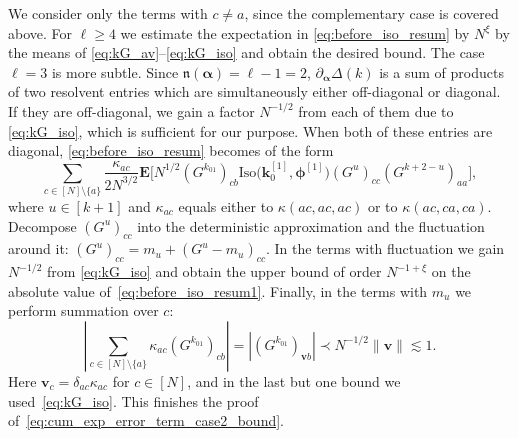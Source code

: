 \documentclass[10pt]{amsart}
\numberwithin{equation}{section}
\newcommand{\E}{\mathbf{E}}
\begin{document}
We consider only the terms with $c\neq a$, since the complementary case is covered above. For $\ell\ge 4$ we estimate the expectation in \eqref{eq:before_iso_resum} by $N^\xi$ by the means of \eqref{eq:kG_av}--\eqref{eq:kG_iso} and obtain the desired bound. The case $\ell=3$ is more subtle. Since $\mathfrak{n}(\bm{\alpha})=\ell-1=2$, $\partial_{\bm{\alpha}}\Delta(k)$ is a sum of products of two resolvent entries which are simultaneously either off-diagonal or diagonal. If they are off-diagonal, we gain a factor $N^{-1/2}$ from each of them due to \eqref{eq:kG_iso}, which is sufficient for our purpose. When both of these entries are diagonal, \eqref{eq:before_iso_resum} becomes of the form
\begin{equation}
\sum_{c\in [N]\setminus\{a\}}\frac{\kappa_{ac}}{2N^{3/2}}\E\bigg[N^{1/2}\left(G^{k_{01}}\right)_{cb}\mathrm{Iso}\big(\bm{k}_0^{[1]},\bm{\phi}^{[1]}\big) (G^u)_{cc}(G^{k+2-u})_{aa}\bigg],
\label{eq:before_iso_resum1}
\end{equation}
where $u\in [k+1]$ and $\kappa_{ac}$ equals either to $\kappa(ac,ac,ac)$ or to $\kappa(ac,ca,ca)$. Decompose $(G^u)_{cc}$ into the deterministic approximation and the fluctuation around it: $(G^u)_{cc}= m_u + (G^u-m_u)_{cc}$. In the terms with fluctuation we gain $N^{-1/2}$ from \eqref{eq:kG_iso} and obtain the upper bound of order $N^{-1+\xi}$ on the absolute value of~\eqref{eq:before_iso_resum1}. Finally, in the terms with $m_u$ we perform summation over $c$:
\begin{equation}
\left\vert \sum_{c\in [N]\setminus\{a\}} \kappa_{ac} \left(G^{k_{01}}\right)_{cb}\right\vert =\left\vert \left(G^{k_{01}}\right)_{\bm{v}b}\right\vert \prec N^{-1/2}\|\bm{v}\|\lesssim 1.
\label{eq:iso_resum}
\end{equation}
Here $\bm{v}_c =\delta_{ac}\kappa_{ac}$ for $c\in [N]$, and in the last but one bound we used~\eqref{eq:kG_iso}. This finishes the proof of~\eqref{eq:cum_exp_error_term_case2_bound}.
\end{document}
